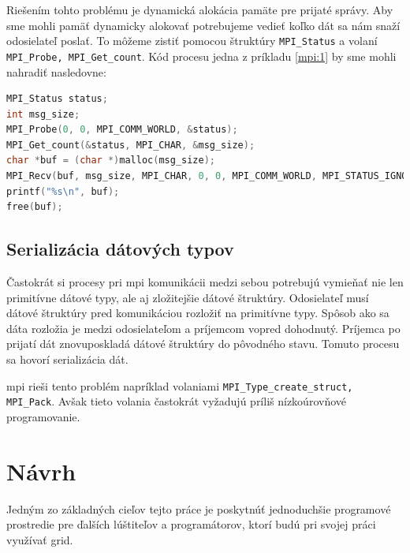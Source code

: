 Riešením tohto problému je dynamická alokácia pamäte pre prijaté správy. Aby sme mohli pamäť dynamicky alokovať potrebujeme vedieť
koľko dát sa nám snaží odosielateľ poslať. To môžeme zistiť pomocou štruktúry \texttt{MPI\_Status} a volaní \texttt{MPI\_Probe, MPI\_Get\_count}.
Kód procesu jedna z príkladu \ref{mpi:1} by sme mohli nahradiť nasledovne:
\begin{lstlisting}[language=c]
MPI_Status status;
int msg_size;
MPI_Probe(0, 0, MPI_COMM_WORLD, &status);
MPI_Get_count(&status, MPI_CHAR, &msg_size);
char *buf = (char *)malloc(msg_size);
MPI_Recv(buf, msg_size, MPI_CHAR, 0, 0, MPI_COMM_WORLD, MPI_STATUS_IGNORE);
printf("%s\n", buf);
free(buf);
\end{lstlisting}

\subsection{Serializácia dátových typov}
\label{kap:serialize}
Častokrát si procesy pri \acrshort{mpi} komunikácii medzi sebou potrebujú vymieňať nie len primitívne dátové typy, ale aj zložitejšie dátové štruktúry.
Odosielateľ musí dátové štruktúry pred komunikáciou rozložiť na primitívne typy. Spôsob ako sa dáta rozložia je medzi odosielateľom a príjemcom vopred dohodnutý.
Príjemca po prijatí dát znovuposkladá dátové štruktúry do pôvodného stavu. Tomuto procesu sa hovorí serializácia dát.

\acrshort{mpi} rieši tento problém napríklad volaniami \texttt{MPI\_Type\_create\_struct, MPI\_Pack}.
Avšak tieto volania častokrát vyžadujú príliš nízkoúrovňové programovanie.


\section{Návrh}
Jedným zo základných cieľov tejto práce je poskytnúť jednoduchšie programové prostredie pre ďalších lúštiteľov a programátorov,
ktorí budú pri svojej práci využívať grid.

